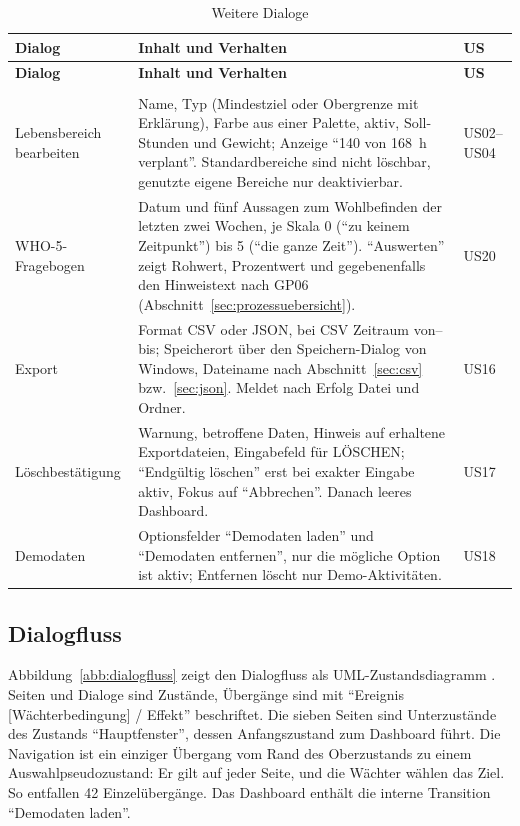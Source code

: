 \begin{longtable}{@{}L{2.6cm}L{10.7cm}L{1.9cm}@{}}
  \caption{Weitere Dialoge}\label{tab:weitere-dialoge}\\
  \toprule
  \textbf{Dialog} & \textbf{Inhalt und Verhalten} & \textbf{US} \\
  \midrule
  \endfirsthead
  \toprule
  \textbf{Dialog} & \textbf{Inhalt und Verhalten} & \textbf{US} \\
  \midrule
  \endhead
  \bottomrule
  \endfoot
  \bottomrule
   \\
  \endlastfoot
  Lebensbereich bearbeiten & Name, Typ (Mindestziel oder Obergrenze mit Erklärung), Farbe aus einer Palette, aktiv, Soll-Stunden und Gewicht; Anzeige \enquote{140 von 168~h verplant}. Standardbereiche sind nicht löschbar, genutzte eigene Bereiche nur deaktivierbar. & US02--US04 \\
  WHO-5-Frage\-bogen & Datum und fünf Aussagen zum Wohlbefinden der letzten zwei Wochen, je Skala 0 (\enquote{zu keinem Zeitpunkt}) bis 5 (\enquote{die ganze Zeit}). \enquote{Auswerten} zeigt Rohwert, Prozentwert und gegebenenfalls den Hinweistext nach GP06 (Abschnitt~\ref{sec:prozessuebersicht}). & US20 \\
  Export & Format \ac{CSV} oder \ac{JSON}, bei CSV Zeitraum von--bis; Speicherort über den Speichern-Dialog von Windows, Dateiname nach Abschnitt~\ref{sec:csv} bzw.~\ref{sec:json}. Meldet nach Erfolg Datei und Ordner. & US16 \\
  Lösch\-bestätigung & Warnung, betroffene Daten, Hinweis auf erhaltene Exportdateien, Eingabefeld für LÖSCHEN; \enquote{Endgültig löschen} erst bei exakter Eingabe aktiv, Fokus auf \enquote{Abbrechen}. Danach leeres Dashboard. & US17 \\
  Demodaten & Optionsfelder \enquote{Demodaten laden} und \enquote{Demodaten entfernen}, nur die mögliche Option ist aktiv; Entfernen löscht nur Demo-Aktivitäten. & US18 \\
\end{longtable}

\subsection{Dialogfluss}\label{sec:dialogfluss}
Abbildung~\ref{abb:dialogfluss} zeigt den Dialogfluss als \ac{UML}-Zustandsdiagramm \parencite[S.~319]{omg2017uml}. Seiten und Dialoge sind Zustände, Übergänge sind mit \enquote{Ereignis [Wächterbedingung] / Effekt} beschriftet. Die sieben Seiten sind Unterzustände des Zustands \enquote{Hauptfenster}, dessen Anfangszustand zum Dashboard führt. Die Navigation ist ein einziger Übergang vom Rand des Oberzustands zu einem Auswahlpseudozustand: Er gilt auf jeder Seite, und die Wächter wählen das Ziel. So entfallen 42 Einzelübergänge. Das Dashboard enthält die interne Transition \enquote{Demodaten laden}.

